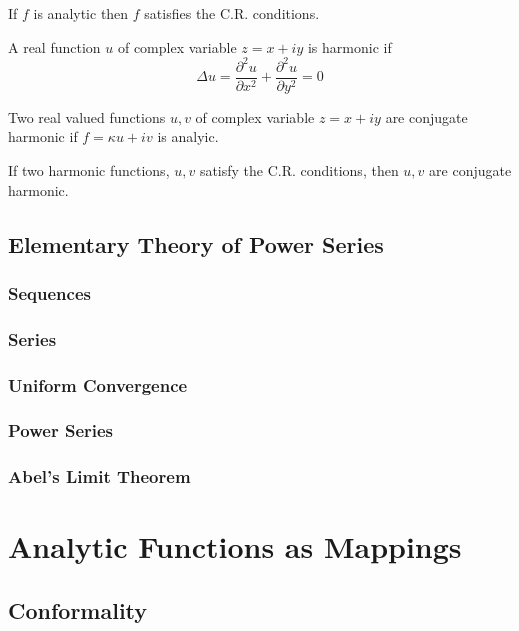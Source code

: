 \begin{important}
	If $f$ is analytic then $f$ satisfies the C.R. conditions.
\end{important}

\begin{definition}[harmonic]
	A real function $u$ of complex variable $z = x+iy$ is harmonic if
\begin{equation}
	\Delta u = \frac{\partial^2 u}{\partial x^2} + \frac{\partial^2 u}{\partial y^2} = 0
	\label{eqn:laplace}
\end{equation}
\end{definition}

\begin{definition}
	Two real valued functions $u,v$ of complex variable $z = x+iy$ are conjugate harmonic if $f = \kappa u+iv$ is analyic.
\end{definition}
\begin{important}
	If two harmonic functions, $u,v$ satisfy the C.R. conditions, then $u,v$ are conjugate harmonic.
\end{important}

\subsection{Elementary Theory of Power Series}
\subsubsection{Sequences}
\subsubsection{Series}
\subsubsection{Uniform Convergence}
\subsubsection{Power Series}
\subsubsection{Abel's Limit Theorem}
\section{Analytic Functions as Mappings}
\setcounter{subsection}{1}
\subsection{Conformality}
